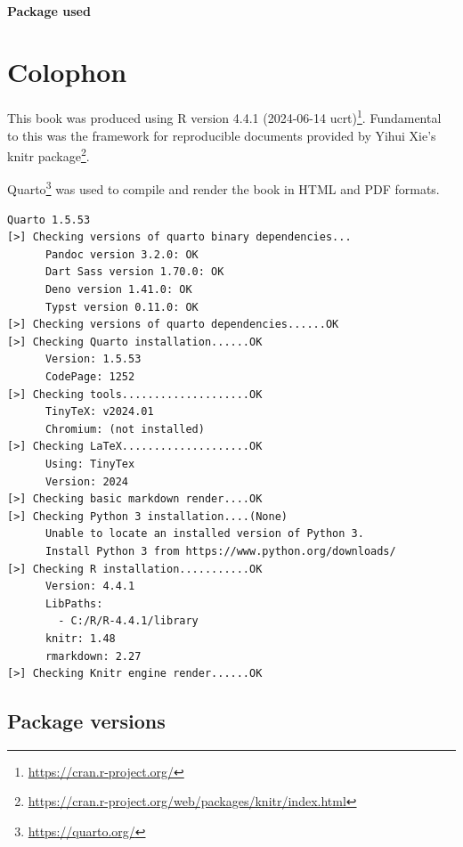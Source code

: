 \documentclass[
  letterpaper,
  10pt,
  krantz2]{krantz}
\providecommand{\href}[2]{#2\footnote{\url{#1}}}
\begin{document}
{\subsubsection*{Package used}\label{package-used}


\chapter*{Colophon}\label{colophon}


This book was produced using \href{https://cran.r-project.org/}{R
version 4.4.1 (2024-06-14 ucrt)}. Fundamental to this was the framework
for reproducible documents provided by Yihui Xie's
\href{https://cran.r-project.org/web/packages/knitr/index.html}{knitr
package}.

\href{https://quarto.org/}{Quarto} was used to compile and render the
book in HTML and PDF formats.

\begin{verbatim}
Quarto 1.5.53
[>] Checking versions of quarto binary dependencies...
      Pandoc version 3.2.0: OK
      Dart Sass version 1.70.0: OK
      Deno version 1.41.0: OK
      Typst version 0.11.0: OK
[>] Checking versions of quarto dependencies......OK
[>] Checking Quarto installation......OK
      Version: 1.5.53
      CodePage: 1252
[>] Checking tools....................OK
      TinyTeX: v2024.01
      Chromium: (not installed)
[>] Checking LaTeX....................OK
      Using: TinyTex
      Version: 2024
[>] Checking basic markdown render....OK
[>] Checking Python 3 installation....(None)
      Unable to locate an installed version of Python 3.
      Install Python 3 from https://www.python.org/downloads/
[>] Checking R installation...........OK
      Version: 4.4.1
      LibPaths:
        - C:/R/R-4.4.1/library
      knitr: 1.48
      rmarkdown: 2.27
[>] Checking Knitr engine render......OK
\end{verbatim}

\section*{Package versions}\label{package-versions}


}
\end{document}
